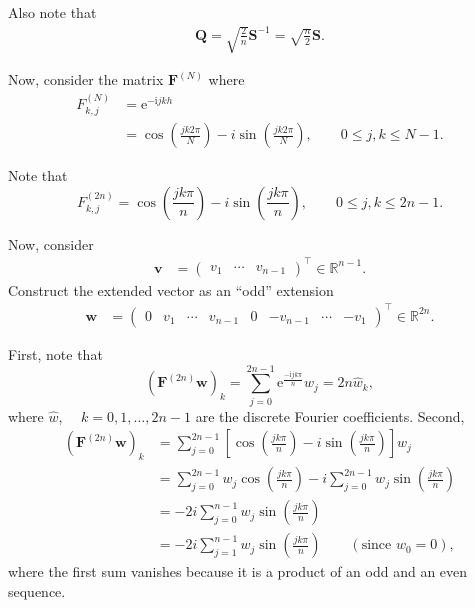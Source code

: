 Also note that
\begin{align*}
  \bm Q = \sqrt{\frac{2}{n}} \bm S^{-1} = \sqrt{\frac{n}{2}} \bm S.
\end{align*}

Now, consider the matrix $\bm F^{(N)}$ where
\begin{equation*}
  \begin{split}
    F_{k,j}^{(N)} &= \text{e}^{-\text{i}jkh} \\
    &= \cos \left( \frac{j k 2 \pi}{N} \right) -
    i \sin \left( \frac{j k 2 \pi}{N} \right),
    \qquad 0 \leq j,k \leq N-1.
  \end{split}
\end{equation*}

Note that
\begin{equation*}
  F_{k,j}^{(2 n)} = \cos \left( \frac{j k \pi}{n} \right)
  - i \sin \left( \frac{j k \pi}{n} \right), \qquad 0 \leq j,k \leq 2n-1.
\end{equation*}

Now, consider
\begin{align*}
  \bm v &= \begin{pmatrix} v_1 & \cdots & v_{n-1} \end{pmatrix}^\intercal \in \mathbb{R}^{n-1}.
\end{align*}
Construct the extended vector as an ``odd'' extension
\begin{align*}
  \bm w &= \begin{pmatrix} 0 & v_1 & \cdots & v_{n-1} & 0 & -v_{n-1} & \cdots & -v_1 \end{pmatrix}^\intercal
  \in \mathbb{R}^{2n}.
\end{align*}

First, note that
\begin{equation*}
  (\bm F^{(2n)} \bm w)_k
  = \sum_{j=0}^{2n-1} \text{e}^{\frac{-\text{i}jk \pi}{n}} w_j
  = 2n \hat{w}_k,
\end{equation*}
where $\hat{w}$, $\quad k=0,1,\ldots,2n-1$ are the discrete Fourier coefficients. Second,
\begin{align*}
  (\bm F^{(2n)} \bm w)_k
  &= \sum_{j=0}^{2n-1} \left[
    \cos \left( \frac{j k \pi}{n} \right)
    - i \sin \left( \frac{jk \pi}{n} \right)
    \right] w_j \\
  &= \sum_{j=0}^{2n-1} w_j \cos \left( \frac{jk \pi}{n} \right)
    - i \sum_{j=0}^{2n-1} w_j \sin \left( \frac{j k \pi}{n} \right) \\
  &= -2i \sum_{j=0}^{n-1} w_j \sin \left( \frac{j k \pi}{n} \right) \\
  &= -2i \sum_{j=1}^{n-1} w_j \sin \left( \frac{j k \pi}{n} \right) \qquad (\text{since } w_0=0),
\end{align*}
where the first sum vanishes because it is a product of an odd and an even sequence.

